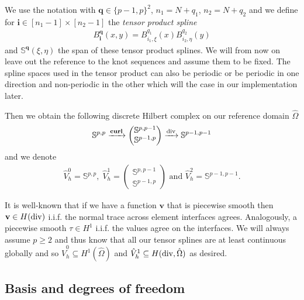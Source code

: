 \documentclass[../master_thesis.tex]{subfiles}
\begin{document}
We use the notation 
with $\mathbf{q} \in \{p-1,p\}^2$, $n_1 = N + q_1$, $n_2 = N + q_2$ 
and we define for $\mathbf{i} \in [n_1-1] \times [n_2-1]$ the \textit{tensor product spline}
\begin{align*}
    B_\mathbf{i}^\mathbf{q}(x,y) =  B_{i_1,\xi}^{q_1}(x) B_{i_2,\eta}^{q_2}(y)
\end{align*}
and $\mathbb{S}^\mathbf{q}(\xi,\eta)$ 
the span of these tensor product splines. We will from now on leave out the reference 
to the knot sequences and assume them to be fixed.
The spline spaces used in the tensor product can also be periodic or be periodic in 
one direction and non-periodic in the other which will the case in our implementation later. 

Then we obtain the following discrete Hilbert complex on our reference domain $\hat{\Omega}$
\begin{align*}
    \mathbb{S}^{p,p} \xrightarrow{\veccurl} \begin{pmatrix}\mathbb{S}^{p,p-1} \\ \mathbb{S}^{p-1,p}  
    \end{pmatrix} \xrightarrow{\diver} \mathbb{S}^{p-1,p-1}
\end{align*}
and we denote
\begin{align}
     \hat{V}^0_h = \mathbb{S}^{p,p}, \; \hat{V}^1_h = \begin{pmatrix}\mathbb{S}^{p,p-1} \\ \mathbb{S}^{p-1,p}  
    \end{pmatrix}
    \text{ and } \hat{V}^2_h = \mathbb{S}^{p-1,p-1}. \label{eq:discrete_spline_reference_spaces}
\end{align}

It is well-known that if we have a function $\mathbf{v}$ that is piecewise smooth 
then $\mathbf{v} \in H(\operatorname{div})$ i.i.f. the normal trace across element interfaces
agrees. Analogously, a piecewise smooth $\tau \in H^1$ i.i.f. the values agree 
on the interfaces. We will always assume $p \geq 2$ and thus know that 
all our tensor splines are at least continuous globally and so
$\hat{V}_h^0 \subseteq H^1(\hat{\Omega})$ and $\hat{V}_h^1 \subseteq H(\operatorname{div},\hat{\Omega})$ as desired. 



\subsection{Basis and degrees of freedom}\label{sec:basis_and_degrees_of_freedom}
\end{document}
